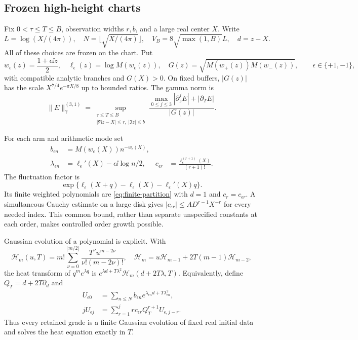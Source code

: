 \subsection{Frozen high-height charts}
Fix $0<\tau\le T\le B$, observation widths $r,b$, and a large real
center $X$. Write
\[
 L=\log(X/(4\pi)),\quad N=\lfloor\sqrt{X/(4\pi)}\rfloor,
 \quad V_B=8\sqrt{\max(1,B)}L,\quad d=z-X.
\]
All of these choices are frozen on the chart. Put
\[
 w_\epsilon(z)=\frac{1+\epsilon\ii z}2,\quad
 \ell_\epsilon(z)=\log M(w_\epsilon(z)),\quad
 G(z)=\sqrt{M(w_+(z))M(w_-(z))},\qquad \epsilon\in\{+1,-1\},
\]
with compatible analytic branches and $G(X)>0$. On fixed buffers,
$|G(z)|$ has the scale $X^{7/4}e^{-\pi X/8}$ up to bounded ratios.
The gamma norm is
\begin{equation}
 \|E\|_\gamma^{(3,1)}=
 \sup_{\substack{\tau\le T\le B\\|\Re z-X|\le r,\ |\Im z|\le b}}
 \frac{\max_{0\le j\le3}|\partial_z^j E|+|\partial_T E|}{|G(z)|}.
 \label{eq:gamma-norm}
\end{equation}

For each arm and arithmetic mode set
\begin{align*}
 b_{\epsilon n}&=M(w_\epsilon(X))n^{-w_\epsilon(X)},\\
 \lambda_{\epsilon n}&=\ell_\epsilon'(X)-\epsilon\ii\log n/2,
 &c_{\epsilon r}&=\frac{\ell_\epsilon^{(r+1)}(X)}{(r+1)!}.
\end{align*}
The fluctuation factor is
\[
 \exp\{\ell_\epsilon(X+q)-\ell_\epsilon(X)-\ell_\epsilon'(X)q\}.
\]
Its finite weighted polynomials are \eqref{eq:finite-partition} with
$d=1$ and $c_r=c_{\epsilon r}$. A simultaneous Cauchy estimate on a
large disk gives $|c_{\epsilon r}|\le A D^{r-1}X^{-r}$ for every needed
index. This common bound, rather than separate unspecified constants
at each order, makes controlled order growth possible.

Gaussian evolution of a polynomial is explicit. With
\begin{equation}
 \mathcal H_m(u,T)=m!\sum_{\nu=0}^{\lfloor m/2\rfloor}
                 \frac{T^\nu u^{m-2\nu}}{\nu!(m-2\nu)!},
 \quad \mathcal H_m=u\mathcal H_{m-1}+2T(m-1)\mathcal H_{m-2},
 \label{eq:heat-moments}
\end{equation}
the heat transform of $q^m e^{\lambda q}$ is
$e^{\lambda d+T\lambda^2}\mathcal H_m(d+2T\lambda,T)$.
Equivalently, define $Q_T=d+2T\partial_d$ and
\begin{align}
 U_{\epsilon0}&=\sum_{n\le N}b_{\epsilon n}
                          e^{\lambda_{\epsilon n}d+T\lambda_{\epsilon n}^2},\\
 jU_{\epsilon j}&=\sum_{r=1}^j r c_{\epsilon r}
                            Q_T^{r+1}U_{\epsilon,j-r}.
 \label{eq:negative-recurrence}
\end{align}
Thus every retained grade is a finite Gaussian evolution of fixed real
initial data and solves the heat equation exactly in $T$.

